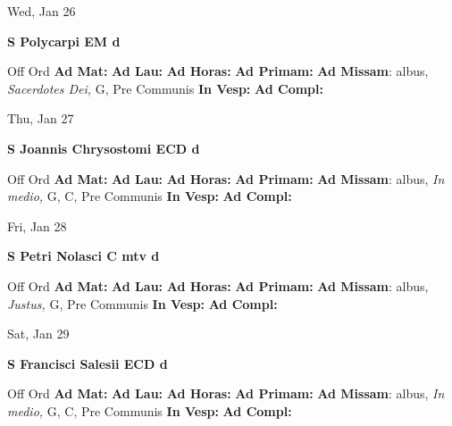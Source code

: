 \documentclass[10pt]{memoir}
\begin{document}
\begin{center}
\begin{minipage}{3.5in}
\vspace{2em}
\begin{center}Wed, Jan 26
\end{center}
\textbf{ \large S Polycarpi EM
\textnormal{\normalsize d}}

\begin{justify}Off Ord
\textbf{Ad Mat: }
\textbf{Ad Lau: }
\textbf{Ad Horas: }
\textbf{Ad Primam: }\textbf{Ad Missam}: albus, \textit{Sacerdotes Dei,} G, Pre Communis
\textbf{In Vesp: }
\textbf{Ad Compl: }
\end{justify}
\end{minipage}
\end{center}

\begin{center}
\begin{minipage}{3.5in}
\vspace{2em}
\begin{center}Thu, Jan 27
\end{center}
\textbf{ \large S Joannis Chrysostomi ECD
\textnormal{\normalsize d}}

\begin{justify}Off Ord
\textbf{Ad Mat: }
\textbf{Ad Lau: }
\textbf{Ad Horas: }
\textbf{Ad Primam: }\textbf{Ad Missam}: albus, \textit{In medio,} G, C, Pre Communis
\textbf{In Vesp: }
\textbf{Ad Compl: }
\end{justify}
\end{minipage}
\end{center}

\begin{center}
\begin{minipage}{3.5in}
\vspace{2em}
\begin{center}Fri, Jan 28
\end{center}
\textbf{ \large S Petri Nolasci C mtv
\textnormal{\normalsize d}}

\begin{justify}Off Ord
\textbf{Ad Mat: }
\textbf{Ad Lau: }
\textbf{Ad Horas: }
\textbf{Ad Primam: }\textbf{Ad Missam}: albus, \textit{Justus,} G, Pre Communis
\textbf{In Vesp: }
\textbf{Ad Compl: }
\end{justify}
\end{minipage}
\end{center}

\begin{center}
\begin{minipage}{3.5in}
\vspace{2em}
\begin{center}Sat, Jan 29
\end{center}
\textbf{ \large S Francisci Salesii ECD
\textnormal{\normalsize d}}

\begin{justify}Off Ord
\textbf{Ad Mat: }
\textbf{Ad Lau: }
\textbf{Ad Horas: }
\textbf{Ad Primam: }\textbf{Ad Missam}: albus, \textit{In medio,} G, C, Pre Communis
\textbf{In Vesp: }
\textbf{Ad Compl: }
\end{justify}
\end{minipage}
\end{center}
\end{document}

